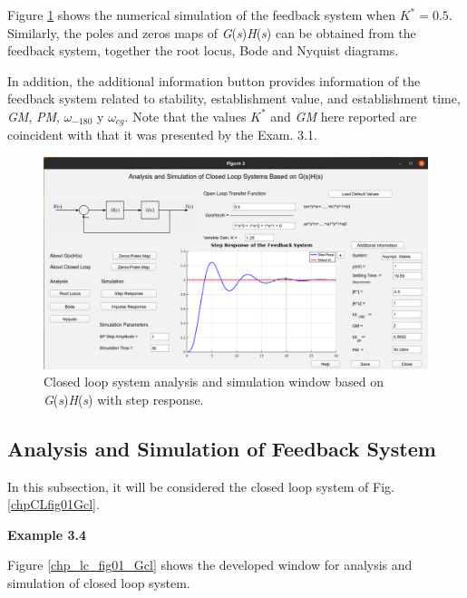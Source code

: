 Figure \ref{chp_lc_fig02_ejemGH} shows the numerical simulation of the feedback system when $K^* = 0.5$. Similarly, the poles and zeros maps of \textit{G}(\textit{s})\textit{H}(\textit{s}) can be obtained from the feedback system, together the root locus, Bode and Nyquist diagrams.

In addition, the additional information button provides information of the feedback system related to stability, establishment value, and establishment time, \textit{GM}, \textit{PM}, $\omega_{-180}$ y $\omega_{cg}$. Note that the values $K^*$ and \textit{GM} here reported are coincident with that it was presented by the Exam. 3.1.

\begin{figure}[H]
	\centering
	\includegraphics[scale=0.5]{./figuras/chapter_glc/fig02_ejemGH.png}
	\caption{Closed loop system analysis and simulation window based on \textit{G}(\textit{s})\textit{H}(\textit{s}) with step response.}
	\label{chp_lc_fig02_ejemGH}
\end{figure}





\subsection{Analysis and Simulation of Feedback System}
In this subsection, it will be considered the closed loop system of Fig. \ref{chpCLfig01Gcl}.


\textbf{Example 3.4}

Figure \ref{chp_lc_fig01_Gcl} shows the developed window for analysis and simulation of closed loop system.

